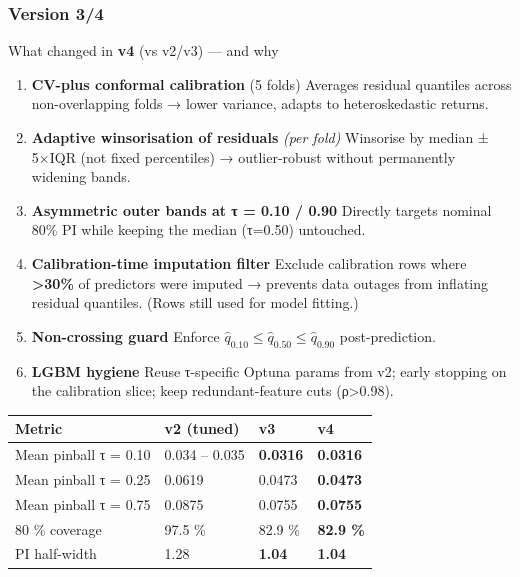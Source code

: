 \documentclass[
  a4paper,
  DIV=11,
  numbers=noendperiod]{scrreprt}
\begin{document}
\subsubsection{Version 3/4}\label{version-34}

What changed in \textbf{v4} (vs v2/v3) --- and why

\begin{enumerate}
\def\labelenumi{\arabic{enumi}.}
\item
  \textbf{CV-plus conformal calibration} (5 folds) Averages residual
  quantiles across non-overlapping folds → lower variance, adapts to
  heteroskedastic returns.
\item
  \textbf{Adaptive winsorisation of residuals} \emph{(per fold)}
  Winsorise by median ± 5×IQR (not fixed percentiles) → outlier-robust
  without permanently widening bands.
\item
  \textbf{Asymmetric outer bands at τ = 0.10 / 0.90} Directly targets
  nominal 80\% PI while keeping the median (τ=0.50) untouched.
\item
  \textbf{Calibration-time imputation filter} Exclude calibration rows
  where \textbf{\textgreater30\%} of predictors were imputed → prevents
  data outages from inflating residual quantiles. (Rows still used for
  model fitting.)
\item
  \textbf{Non-crossing guard} Enforce
  \(\hat q_{0.10} \le \hat q_{0.50} \le \hat q_{0.90}\) post-prediction.
\item
  \textbf{LGBM hygiene} Reuse τ-specific Optuna params from v2; early
  stopping on the calibration slice; keep redundant-feature cuts
  (\textbar ρ\textbar\textgreater0.98).
\end{enumerate}

\begin{longtable}[]{@{}llll@{}}
\toprule\noalign{}
Metric & v2 (tuned) & v3 & \textbf{v4} \\
\midrule\noalign{}
\endhead
\bottomrule\noalign{}
\endlastfoot
Mean pinball τ = 0.10 & 0.034 -- 0.035 & \textbf{0.0316} &
\textbf{0.0316} \\
Mean pinball τ = 0.25 & 0.0619 & 0.0473 & \textbf{0.0473} \\
Mean pinball τ = 0.75 & 0.0875 & 0.0755 & \textbf{0.0755} \\
80 \% coverage & 97.5 \% & 82.9 \% & \textbf{82.9 \%} \\
PI half-width & 1.28 & \textbf{1.04} & \textbf{1.04} \\
\end{longtable}
\end{document}
